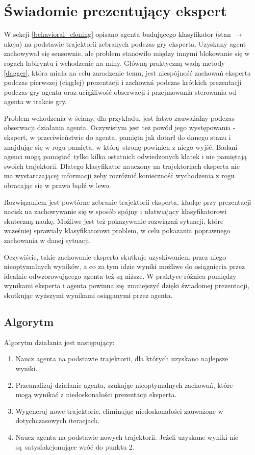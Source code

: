 \section{Świadomie prezentujący ekspert}\label{presenting_expert}
W sekcji \ref{behavioral_cloning} opisano agenta budującego klasyfikator (stan $\to$ akcja) na podstawie trajektorii zebranych podczas gry eksperta. Uzyskany agent zachowywał się sensownie, ale problem stanowiło między innymi blokowanie się w rogach labiryntu i wchodzenie na miny. Główną praktyczną wadą metody \ref{dagger}, która miała na celu zaradzenie temu, jest niespójność zachowań eksperta podczas pierwszej (ciągłej) prezentacji i zachowań podczas krótkich prezentacji podczas gry agenta oraz uciążliwość obserwacji i przejmowania sterowania od agenta w trakcie gry.

Problem wchodzenia w ściany, dla przykładu, jest łatwo zauważalny podczas obserwacji działania agenta. Oczywistym jest też powód jego występowania - ekspert, w przeciwieństwie do agenta, pamięta jak dotarł do danego stanu i znajdując się w rogu pamięta, w którą stronę powinien z niego wyjść. Badani agenci mogą pamiętać tylko kilka ostatnich odwiedzonych klatek i nie pamiętają swoich trajektorii. Dlatego klasyfikator nauczony na trajektoriach eksperta nie ma wystarczającej informacji żeby rozróżnić konieczność wychodzenia z rogu obracając się w prawo bądź w lewo.

Rozwiązaniem jest powtórne zebranie trajektorii eksperta, kładąc przy prezentacji nacisk na zachowywanie się w sposób spójny i ułatwiający klasyfikatorowi skuteczną naukę. Możliwe jest też pokazywanie rozwiązań sytuacji, które wcześniej sprawiały klasyfikatorowi problem, w celu pokazania poprawnego zachowania w danej sytuacji.

Oczywiście, takie zachowanie eksperta skutkuje uzyskiwaniem przez niego nieoptymalnych wyników, a co za tym idzie wyniki możliwe do osiągnięcia przez idealnie odwzorowującego agenta też są niższe. W praktyce różnica pomiędzy wynikami eksperta i agenta powinna się zmniejszyć dzięki świadomej prezentacji, skutkując wyższymi wynikami osiąganymi przez agenta.

\subsection{Algorytm}

Algorytm działania jest następujący:
\begin{enumerate}
\item{Naucz agenta na podstawie trajektorii, dla których uzyskano najlepsze wyniki.}
\item{Przeanalizuj działanie agenta, szukając nieoptymalnych zachowań, które mogą wynikać z niedoskonałości prezentacji eksperta.}
\item{Wygeneruj nowe trajektorie, eliminując niedoskonałości zauważone w dotychczasowych iteracjach. }
\item{Naucz agenta na podstawie nowych trajektorii. Jeżeli uzyskane wyniki nie są satysfakcjonujące wróć do punktu 2.}
\end{enumerate}

